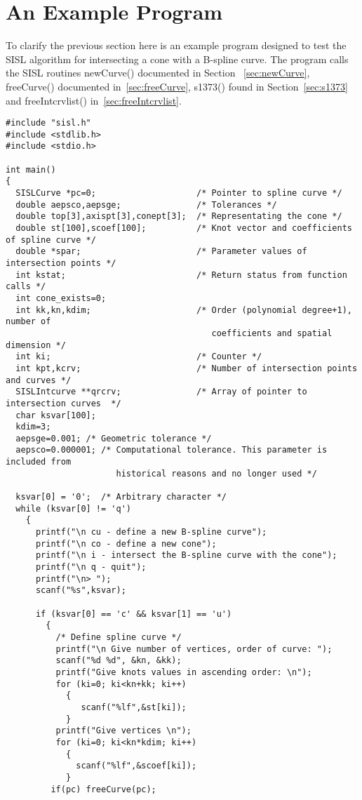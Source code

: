 \newpage
\section{An Example Program} \label{sec:exampleprog}

To clarify the previous section here is an example program designed to
test the SISL algorithm for intersecting a cone with
a B-spline curve. The program calls the SISL routines newCurve() documented in
Section ~\ref{sec:newCurve}, freeCurve() documented in~\ref{sec:freeCurve},
s1373() found in Section~\ref{sec:s1373} and freeIntcrvlist() in~\ref{sec:freeIntcrvlist}.

\begin{verbatim}
#include "sisl.h"
#include <stdlib.h>  
#include <stdio.h>

int main()
{
  SISLCurve *pc=0;                    /* Pointer to spline curve */
  double aepsco,aepsge;               /* Tolerances */
  double top[3],axispt[3],conept[3];  /* Representating the cone */
  double st[100],scoef[100];          /* Knot vector and coefficients of spline curve */
  double *spar;                       /* Parameter values of intersection points */
  int kstat;                          /* Return status from function calls */
  int cone_exists=0;
  int kk,kn,kdim;                     /* Order (polynomial degree+1), number of 
                                         coefficients and spatial dimension */
  int ki;                             /* Counter */
  int kpt,kcrv;                       /* Number of intersection points and curves */
  SISLIntcurve **qrcrv;               /* Array of pointer to intersection curves  */
  char ksvar[100];                    
  kdim=3;
  aepsge=0.001; /* Geometric tolerance */
  aepsco=0.000001; /* Computational tolerance. This parameter is included from 
                      historical reasons and no longer used */

  ksvar[0] = '0';  /* Arbitrary character */
  while (ksvar[0] != 'q')
    {
      printf("\n cu - define a new B-spline curve");
      printf("\n co - define a new cone");
      printf("\n i - intersect the B-spline curve with the cone");
      printf("\n q - quit");
      printf("\n> ");
      scanf("%s",ksvar);

      if (ksvar[0] == 'c' && ksvar[1] == 'u')
        {
          /* Define spline curve */
          printf("\n Give number of vertices, order of curve: ");
          scanf("%d %d", &kn, &kk);
          printf("Give knots values in ascending order: \n");
          for (ki=0; ki<kn+kk; ki++)
            {
               scanf("%lf",&st[ki]);
            }
          printf("Give vertices \n");
          for (ki=0; ki<kn*kdim; ki++)
            {
              scanf("%lf",&scoef[ki]);
            }
         if(pc) freeCurve(pc);


\end{verbatim}
